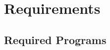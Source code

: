 \documentclass[11pt,a4paper,twoside]{article}
\newcommand{\+}{\discretionary{\mbox{\scriptsize$\hookleftarrow$}}{}{}}
\begin{document}
\newpage
\MHAcopyright{}
\newpage
\tableofcontents
\newpage
{}

\section{Requirements}
\subsection{Required Programs}
\label{subsec:required_prog}
\end{document}
